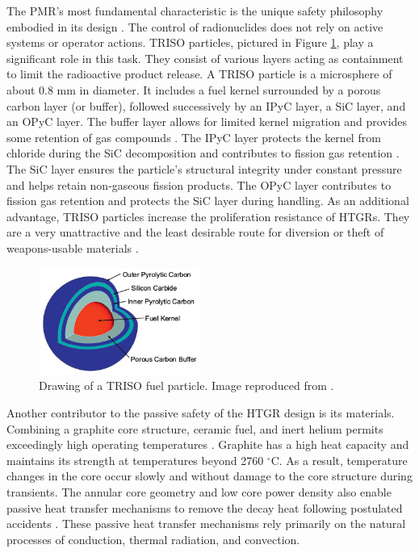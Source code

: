 The \gls{PMR}'s most fundamental characteristic is the unique safety philosophy embodied in its design \cite{iaea_current_2001}.
The control of radionuclides does not rely on active systems or operator actions.
\gls{TRISO} particles, pictured in Figure \ref{fig:triso}, play a significant role in this task.
They consist of various layers acting as containment to limit the radioactive product release.
A \gls{TRISO} particle is a microsphere of about 0.8 mm in diameter.
It includes a fuel kernel surrounded by a porous carbon layer (or buffer), followed successively by an \gls{IPyC} layer, a \gls{SiC} layer, and an \gls{OPyC} layer.
The buffer layer allows for limited kernel migration and provides some retention of gas compounds \cite{oecd_nea_benchmark_2017}.
The \gls{IPyC} layer protects the kernel from chloride during the \gls{SiC} decomposition and contributes to fission gas retention \cite{demkowickz_paul_triso_2019}.
The \gls{SiC} layer ensures the particle's structural integrity under constant pressure and helps retain non-gaseous fission products.
The \gls{OPyC} layer contributes to fission gas retention and protects the \gls{SiC} layer during handling.
As an additional advantage, \gls{TRISO} particles increase the proliferation resistance of \glspl{HTGR}.
They are a very unattractive and the least desirable route for diversion or theft of weapons-usable materials \cite{huning_steady_2014}.

\begin{figure}[htbp!]
	\centering
	\includegraphics[height=3.5cm]{figures/triso}
	\caption{Drawing of a TRISO fuel particle. Image reproduced from \cite{hales_multidimensional_2013}.}
	\label{fig:triso}
\end{figure}

Another contributor to the passive safety of the \gls{HTGR} design is its materials.
Combining a graphite core structure, ceramic fuel, and inert helium permits exceedingly high operating temperatures \cite{ballinger_balance_2004}.
Graphite has a high heat capacity and maintains its strength at temperatures beyond 2760 $^{\circ}$C.
As a result, temperature changes in the core occur slowly and without damage to the core structure during transients.
The annular core geometry and low core power density also enable passive heat transfer mechanisms to remove the decay heat following postulated accidents \cite{neylan_modular_1988}.
These passive heat transfer mechanisms rely primarily on the natural processes of conduction, thermal radiation, and convection.

